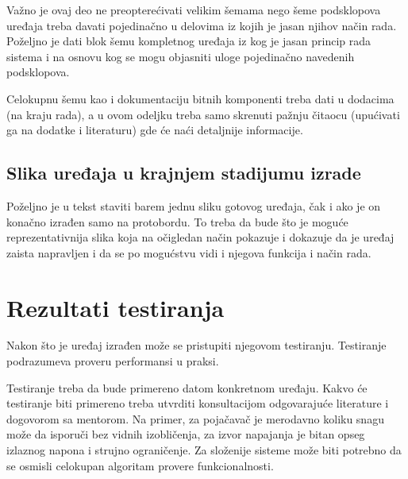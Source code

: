 \documentclass[a4paper, 12pt]{article}
\begin{document}
\vspace{10pt}

Važno je ovaj deo ne preopterećivati velikim šemama nego šeme podsklopova uređaja treba davati pojedinačno u delovima iz kojih je jasan njihov način rada. Poželjno je dati blok šemu kompletnog uređaja iz kog je jasan princip rada sistema i na osnovu kog se mogu objasniti uloge pojedinačno navedenih podsklopova.

\vspace{10pt}

Celokupnu šemu kao i dokumentaciju bitnih komponenti treba dati u dodacima (na kraju rada), a u ovom odeljku treba samo skrenuti pažnju čitaocu (upućivati ga na dodatke i literaturu) gde će naći detaljnije informacije.

\vspace{10pt}

	\subsection{Slika uređaja u krajnjem stadijumu izrade}

\vspace{10pt}

Poželjno je u tekst staviti barem jednu sliku gotovog uređaja, čak i ako je on konačno izrađen samo na protobordu. To treba da bude što je moguće reprezentativnija slika koja na očigledan način pokazuje i dokazuje da je uređaj zaista napravljen i da se po mogućstvu vidi i njegova funkcija i način rada.

\pagebreak

\section{Rezultati testiranja}

\vspace{10pt}

Nakon što je uređaj izrađen može se pristupiti njegovom testiranju. Testiranje podrazumeva proveru performansi u praksi.

\vspace{10pt}

Testiranje treba da bude primereno datom konkretnom uređaju. Kakvo će testiranje biti primereno treba utvrditi konsultacijom odgovarajuće literature i dogovorom sa mentorom. Na primer, za pojačavač je merodavno koliku snagu može da isporuči bez vidnih izobličenja, za izvor napajanja je bitan opseg izlaznog napona i strujno ograničenje. Za složenije sisteme može biti potrebno da se osmisli celokupan algoritam provere funkcionalnosti.
\end{document}
